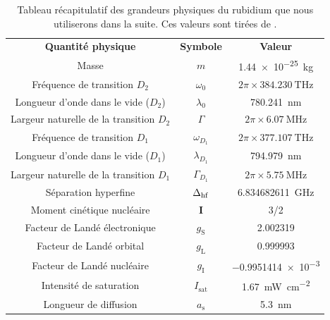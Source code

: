 \setlength{\arrayrulewidth}{0.5mm}
\begin{table}[!ht]
\begin{center}
{
\begin{tabular}{ c|c|c }
{\color{MainColor} \textbf{Quantité physique}} & {\color{MainColor}\textbf{Symbole}} & {\color{MainColor}\textbf{Valeur}} \\
Masse & $m$ & \SI{1.44e-25}{\kilogram} \\
Fréquence de transition $D_2$ & $\omega_0$ & $2\pi \times \SI{384.230}{\tera\hertz}$ \\
Longueur d'onde dans le vide ($D_2$) & $\lambda_{\mathrm{0}}$ & \SI{780.241}{\nano\metre} \\
Largeur naturelle de la transition $D_2$ & $\Gamma$ & $2\pi \times \SI{6.07}{\mega\hertz}$ \\
Fréquence de transition $D_1$ & $\omega_{D_1}$ & $2\pi \times \SI{377.107}{\tera\hertz}$ \\
Longueur d'onde dans le vide ($D_1$) & $\lambda_{D_1}$ & \SI{794.979}{\nano\metre} \\
Largeur naturelle de la transition $D_1$ & $\Gamma_{D_1}$ & $2\pi \times \SI{5.75}{\mega\hertz}$ \\
Séparation hyperfine & $\Delta_{\mathrm{hf}}$ & \SI{6.834682611}{\giga\hertz} \\
Moment cinétique nucléaire & $\mathbf{I}$ & 3/2 \\
Facteur de Landé électronique & $g_{\mathrm{S}}$ & 2.002319 \\
Facteur de Landé orbital & $g_{\mathrm{L}}$ & 0.999993\\
Facteur de Landé nucléaire & $g_{\mathrm{I}}$ & \num{-0.9951414e-3} \\
Intensité de saturation & $I_{\mathrm{sat}}$ & \SI{1.67}{\milli\watt\per\centi\metre^2} \\
Longueur de diffusion & $a_{\mathrm{s}}$ & \SI{5.3}{\nano\metre} \\
\end{tabular}}
\end{center}
\caption{Tableau récapitulatif des grandeurs physiques du rubidium  que nous utiliserons dans la suite. Ces valeurs sont tirées de \citep{steck2001rubidium}.}
\label{tbl:Rb87}
\end{table}

